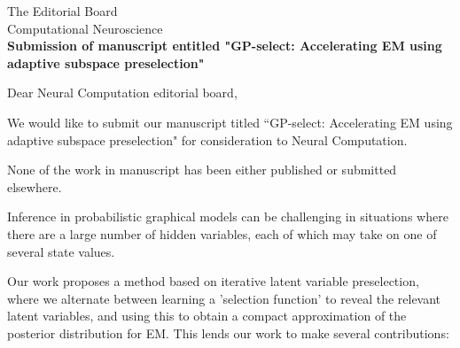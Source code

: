 \documentclass[10pt]{letter}
\begin{document}
\begin{letter}{
The Editorial Board\\
Computational Neuroscience\\
\vspace{10mm}
\textbf{Submission of manuscript entitled "GP-select: Accelerating EM using adaptive
subspace preselection"}
}

%
%
%
%
%
%
% 

\opening{Dear Neural Computation editorial board,}

We would like to submit our manuscript titled ``GP-select: Accelerating EM using adaptive
subspace preselection" for consideration to Neural Computation. 

None of the work in manuscript has been either published or submitted elsewhere.

Inference in probabilistic graphical models can be challenging in situations where there
are a large number of hidden variables, each of which may take on one of several state values.

Our work proposes a method based on iterative latent variable preselection, where we alternate between learning a 'selection function' to reveal the relevant latent variables, and using this to obtain a compact approximation of the posterior distribution for EM.
This lends our work to make several contributions: 


\end{letter}
\end{document}
